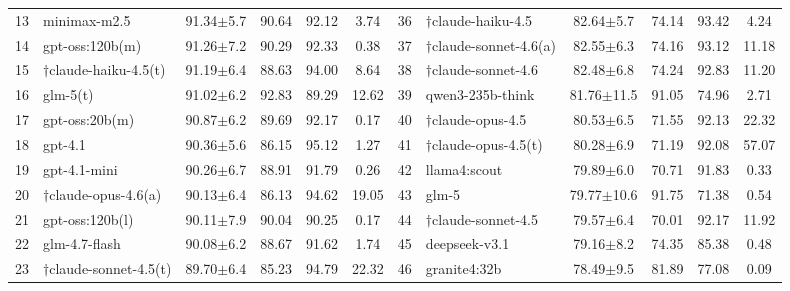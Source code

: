 \documentclass[runningheads]{llncs}
\begin{document}
\begin{table}[htbp]
\begin{tabular}{rlcrrc|rlcrrc}
13 & minimax-m2.5 & 91.34\tiny$\pm$5.7 & 90.64 & 92.12 & 3.74 & 36 & $\dagger$claude-haiku-4.5 & 82.64\tiny$\pm$5.7 & 74.14 & 93.42 & 4.24 \\
14 & gpt-oss:120b(m) & 91.26\tiny$\pm$7.2 & 90.29 & 92.33 & 0.38 & 37 & $\dagger$claude-sonnet-4.6(a) & 82.55\tiny$\pm$6.3 & 74.16 & 93.12 & 11.18 \\
15 & $\dagger$claude-haiku-4.5(t) & 91.19\tiny$\pm$6.4 & 88.63 & 94.00 & 8.64 & 38 & $\dagger$claude-sonnet-4.6 & 82.48\tiny$\pm$6.8 & 74.24 & 92.83 & 11.20 \\
16 & glm-5(t) & 91.02\tiny$\pm$6.2 & 92.83 & 89.29 & 12.62 & 39 & qwen3-235b-think & 81.76\tiny$\pm$11.5 & 91.05 & 74.96 & 2.71 \\
17 & gpt-oss:20b(m) & 90.87\tiny$\pm$6.2 & 89.69 & 92.17 & 0.17 & 40 & $\dagger$claude-opus-4.5 & 80.53\tiny$\pm$6.5 & 71.55 & 92.13 & 22.32 \\
18 & gpt-4.1 & 90.36\tiny$\pm$5.6 & 86.15 & 95.12 & 1.27 & 41 & $\dagger$claude-opus-4.5(t) & 80.28\tiny$\pm$6.9 & 71.19 & 92.08 & 57.07 \\
19 & gpt-4.1-mini & 90.26\tiny$\pm$6.7 & 88.91 & 91.79 & 0.26 & 42 & llama4:scout & 79.89\tiny$\pm$6.0 & 70.71 & 91.83 & 0.33 \\
20 & $\dagger$claude-opus-4.6(a) & 90.13\tiny$\pm$6.4 & 86.13 & 94.62 & 19.05 & 43 & glm-5 & 79.77\tiny$\pm$10.6 & 91.75 & 71.38 & 0.54 \\
21 & gpt-oss:120b(l) & 90.11\tiny$\pm$7.9 & 90.04 & 90.25 & 0.17 & 44 & $\dagger$claude-sonnet-4.5 & 79.57\tiny$\pm$6.4 & 70.01 & 92.17 & 11.92 \\
22 & glm-4.7-flash & 90.08\tiny$\pm$6.2 & 88.67 & 91.62 & 1.74 & 45 & deepseek-v3.1 & 79.16\tiny$\pm$8.2 & 74.35 & 85.38 & 0.48 \\
23 & $\dagger$claude-sonnet-4.5(t) & 89.70\tiny$\pm$6.4 & 85.23 & 94.79 & 22.32 & 46 & granite4:32b & 78.49\tiny$\pm$9.5 & 81.89 & 77.08 & 0.09 \\
\bottomrule
\end{tabular}
\end{table}

\end{document}
